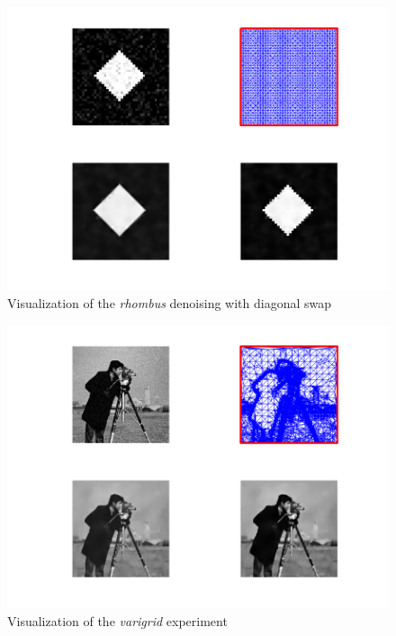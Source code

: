 \documentclass{report}
\begin{document}
\begin{figure}
	\includegraphics[width=\textwidth]{../out/report_diagswp2.png}
	\caption{Visualization of the \textit{rhombus} denoising with diagonal swap}
	\label{vis:diagswp2}
\end{figure}

\begin{figure}
	\includegraphics[width=\textwidth]{../out/report_varigrid.png}
	\caption{Visualization of the \textit{varigrid} experiment}
	\label{vis:varigrid}
\end{figure}
\end{document}
